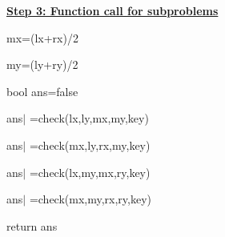 \documentclass[14pt]{article}
\renewcommand{\_}{\kern-1.5pt\textunderscore\kern-1.5pt}
\begin{document}
\begin{multicols}{2}
\begin{enumerate}
\vspace{\baselineskip}
\begin{justify}
\textbf{\uline{Step 3: Function call for subproblems}} 
\end{justify}
\begin{justify}
mx=(lx+rx)/2
\end{justify}
\begin{justify}
my=(ly+ry)/2
\end{justify}
\begin{justify}
bool ans=false
\end{justify}
\begin{justify}
ans$ \vert $ =check(lx,ly,mx,my,key)
\end{justify}
\begin{justify}
ans$ \vert $ =check(mx,ly,rx,my,key)
\end{justify}
\begin{justify}
ans$ \vert $ =check(lx,my,mx,ry,key)
\end{justify}
\begin{justify}
ans$ \vert $ =check(mx,my,rx,ry,key)
\end{justify}
\begin{justify}
return ans
\end{justify}

\vspace{\baselineskip}


\end{enumerate}
\end{multicols}
\end{document}
